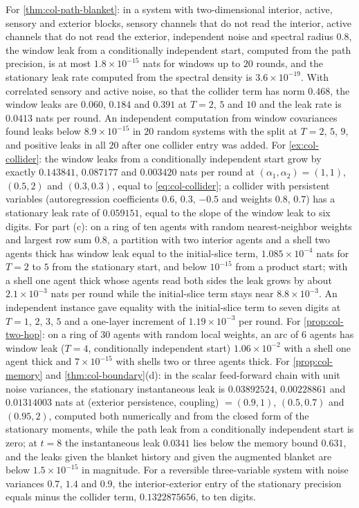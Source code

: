 \begin{numcheck}
For \cref{thm:col-path-blanket}: in a system with two-dimensional interior, active, sensory and exterior blocks, sensory channels that do not read the interior, active channels that do not read the exterior, independent noise and spectral radius $0.8$, the window leak from a conditionally independent start, computed from the path precision, is at most $1.8\times10^{-15}$ nats for windows up to $20$ rounds, and the stationary leak rate computed from the spectral density is $3.6\times10^{-19}$. With correlated sensory and active noise, so that the collider term has norm $0.468$, the window leaks are $0.060$, $0.184$ and $0.391$ at $T=2$, $5$ and $10$ and the leak rate is $0.0413$ nats per round. An independent computation from window covariances found leaks below $8.9\times10^{-15}$ in $20$ random systems with the split at $T=2$, $5$, $9$, and positive leaks in all $20$ after one collider entry was added. For \cref{ex:col-collider}: the window leaks from a conditionally independent start grow by exactly $0.143841$, $0.087177$ and $0.003420$ nats per round at $(\alpha_1,\alpha_2)=(1,1)$, $(0.5,2)$ and $(0.3,0.3)$, equal to \eqref{eq:col-collider}; a collider with persistent variables (autoregression coefficients $0.6$, $0.3$, $-0.5$ and weights $0.8$, $0.7$) has a stationary leak rate of $0.059151$, equal to the slope of the window leak to six digits. For part (c): on a ring of ten agents with random nearest-neighbor weights and largest row sum $0.8$, a partition with two interior agents and a shell two agents thick has window leak equal to the initial-slice term, $1.085\times10^{-4}$ nats for $T=2$ to $5$ from the stationary start, and below $10^{-15}$ from a product start; with a shell one agent thick whose agents read both sides the leak grows by about $2.1\times10^{-3}$ nats per round while the initial-slice term stays near $8.8\times10^{-3}$. An independent instance gave equality with the initial-slice term to seven digits at $T=1$, $2$, $3$, $5$ and a one-layer increment of $1.19\times10^{-3}$ per round. For \cref{prop:col-two-hop}: on a ring of $30$ agents with random local weights, an arc of $6$ agents has window leak ($T=4$, conditionally independent start) $1.06\times10^{-2}$ with a shell one agent thick and $7\times10^{-15}$ with shells two or three agents thick. For \cref{prop:col-memory} and \cref{thm:col-boundary}(d): in the scalar feed-forward chain with unit noise variances, the stationary instantaneous leak is $0.03892524$, $0.00228861$ and $0.01314003$ nats at (exterior persistence, coupling) $=(0.9,1)$, $(0.5,0.7)$ and $(0.95,2)$, computed both numerically and from the closed form of the stationary moments, while the path leak from a conditionally independent start is zero; at $t=8$ the instantaneous leak $0.0341$ lies below the memory bound $0.631$, and the leaks given the blanket history and given the augmented blanket are below $1.5\times10^{-15}$ in magnitude. For a reversible three-variable system with noise variances $0.7$, $1.4$ and $0.9$, the interior-exterior entry of the stationary precision equals minus the collider term, $0.1322875656$, to ten digits.
\end{numcheck}
